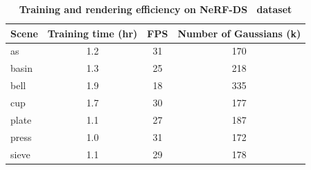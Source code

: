 \begin{table}[t]
\centering
\small
\caption{\textbf{Training and rendering efficiency on NeRF-DS~\citep{yan2023nerf} dataset}}
\label{tab:fps}
\begin{tabular}{lccc}
    \toprule
     Scene &  Training time (hr) & FPS & Number of Gaussians (k) \\
    \midrule
    as &1.2  &31  &170  \\
    basin &1.3  &25  &218  \\
    bell &1.9  &18  &335  \\
    cup &1.7  &30 &177  \\
    plate &1.1  &27 &187  \\
    press &1.0  &31 &172  \\
    sieve &1.1  &29 &178  \\
    \bottomrule
\end{tabular}
\end{table}